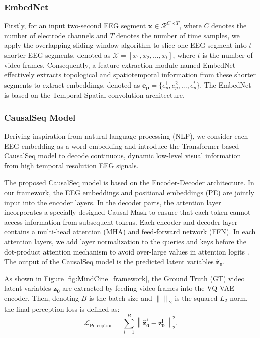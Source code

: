 \documentclass{article}
\begin{document}
\subsubsection{EmbedNet}
Firstly, for an input two-second EEG segment $\mathbf{x} \in \mathcal{R}^{C \times T}$, where $C$ denotes the number of electrode channels and $T$ denotes the number of time samples, we apply the overlapping sliding window algorithm to slice one EEG segment into $t$ shorter EEG segments, denoted as $\mathbf{\mathcal{X}}=[x_1,x_2,...,x_{t}]$, where $t$ is the number of video frames.  Consequently, a feature extraction module named EmbedNet effectively extracts topological and spatiotemporal information from these shorter segments to extract embeddings, denoted as $\mathbf{e_p}= \{ e^1_p,e^2_p,...,e_p^t\}$. The EmbedNet is based on the Temporal-Spatial convolution architecture.

\subsubsection{CausalSeq Model}
Deriving inspiration from natural language processing (NLP), we consider each EEG embedding as a word embedding and introduce the Transformer-based CausalSeq model to decode continuous, dynamic low-level visual information from high temporal resolution EEG signals.

The proposed CausalSeq model is based on the Encoder-Decoder architecture. In our framework, the EEG embeddings and positional embeddings (PE) are jointly input into the encoder layers. In the decoder parts, the attention layer incorporates a specially designed Causal Mask to ensure that each token cannot access information from subsequent tokens. Each encoder and decoder layer contains a multi-head attention (MHA) and feed-forward network (FFN).  In each attention layers, we add layer normalization to the queries and keys before the dot-product attention mechanism to avoid over-large values in attention logits \cite{jiang2024large}. The output of the CausalSeq model is the predicted latent variables $\mathbf{\hat{z}_0}$.

As shown in Figure \ref{fig:MindCine_framework}, the Ground Truth (GT) video latent variables $\mathbf{z_0}$ are extracted by feeding video frames into the VQ-VAE encoder. Then, denoting $B$ is the batch size and $\left\|\right\|_2$ is the squared $L_2$-norm, the final perception loss is defined as:
\begin{equation}
\mathcal{L}_{\text{Perception}} = \sum_{i=1}^{B} \left\| \mathbf{\hat{z}^i_0} - \mathbf{z_0^i}\right\|_2^2.
\end{equation}
\end{document}
